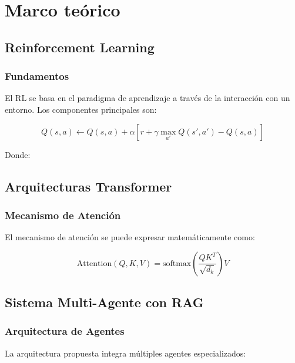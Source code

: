 \chapter{Marco teórico}
\label{marco-teorico}

\section{Reinforcement Learning}

\subsection{Fundamentos}


El RL se basa en el paradigma de aprendizaje a través de la interacción con un entorno. Los componentes principales son:

\begin{equation}
  Q(s,a) \leftarrow Q(s,a) + \alpha[r + \gamma \max_{a'}Q(s',a') - Q(s,a)]
\end{equation}

Donde:

\section{Arquitecturas Transformer}
\subsection{Mecanismo de Atención}
El mecanismo de atención se puede expresar matemáticamente como:

\begin{equation}
  \text{Attention}(Q,K,V) = \text{softmax}\left(\frac{QK^T}{\sqrt{d_k}}\right)V
\end{equation}

\section{Sistema Multi-Agente con RAG}
\subsection{Arquitectura de Agentes}
La arquitectura propuesta integra múltiples agentes especializados:


